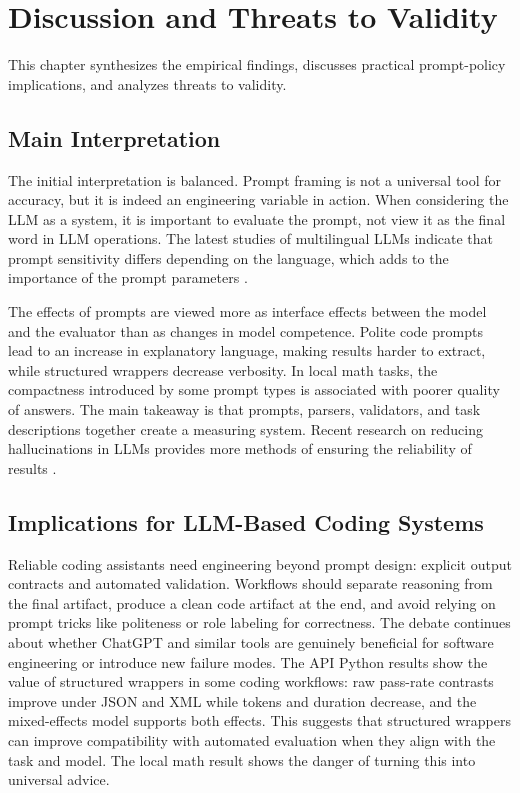 \chapter{Discussion and Threats to Validity\label{cha:chapter6}}

This chapter synthesizes the empirical findings, discusses practical prompt-policy implications, and analyzes threats to validity.

\section{Main Interpretation\label{sec:main-interpretation}}

The initial interpretation is balanced. Prompt framing is not a universal tool for accuracy, but it is indeed an engineering variable in action. When considering the LLM as a system, it is important to evaluate the prompt, not view it as the final word in LLM operations. The latest studies of multilingual LLMs indicate that prompt sensitivity differs depending on the language, which adds to the importance of the prompt parameters \cite{zhu2024multilingual}.

The effects of prompts are viewed more as interface effects between the model and the evaluator than as changes in model competence. Polite code prompts lead to an increase in explanatory language, making results harder to extract, while structured wrappers decrease verbosity. In local math tasks, the compactness introduced by some prompt types is associated with poorer quality of answers. The main takeaway is that prompts, parsers, validators, and task descriptions together create a measuring system. Recent research on reducing hallucinations in LLMs provides more methods of ensuring the reliability of results \cite{tonmoy2024hallucination, gao2023retrieval}.

\section{Implications for LLM-Based Coding Systems}

Reliable coding assistants need engineering beyond prompt design: explicit output contracts and automated validation. Workflows should separate reasoning from the final artifact, produce a clean code artifact at the end, and avoid relying on prompt tricks like politeness or role labeling for correctness. The debate continues about whether ChatGPT and similar tools are genuinely beneficial for software engineering or introduce new failure modes.
The API Python results show the value of structured wrappers in some coding workflows: raw pass-rate contrasts improve under JSON and XML while tokens and duration decrease, and the mixed-effects model supports both effects. This suggests that structured wrappers can improve compatibility with automated evaluation when they align with the task and model. The local math result shows the danger of turning this into universal advice.

